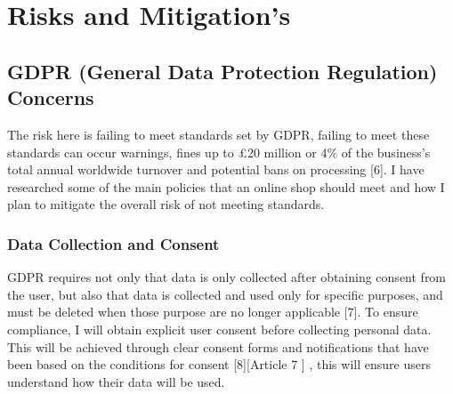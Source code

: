 \documentclass[]{project_report}
\begin{document}
\begin{center}
\end{center}



\chapter{Risks and Mitigation's}

\section{GDPR (General Data Protection Regulation) Concerns}

The risk here is failing to meet standards set by GDPR, failing to meet these standards can occur warnings, fines up to £20 million or 4\% of the business’s total annual worldwide turnover and potential bans on processing [6]. I have researched some of the main policies that an online shop should meet and how I plan to mitigate the overall risk of not meeting standards.

\subsection{Data Collection and Consent}
GDPR requires not only that data is only collected after obtaining consent from the user, but also that data is collected and used only for specific purposes, and must be deleted when those purpose are no longer applicable [7]. To ensure compliance, I will obtain explicit user consent before collecting personal data. This will be achieved through clear consent forms and notifications that have been based on the conditions for consent [8][Article 7 ] , this will ensure users understand how their data will be used.
\end{document}

